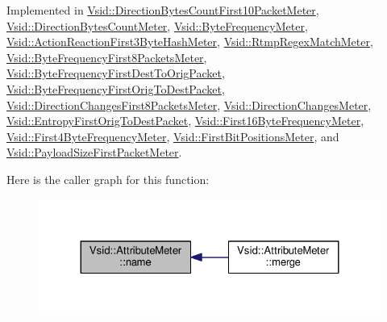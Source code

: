 Implemented in \hyperlink{class_vsid_1_1_direction_bytes_count_first10_packet_meter_a7b947a2f9a0c68e8f26d33731ddee1e4}{Vsid\-::\-Direction\-Bytes\-Count\-First10\-Packet\-Meter}, \hyperlink{class_vsid_1_1_direction_bytes_count_meter_aa6dbbee305932631395d596f8c68c7f9}{Vsid\-::\-Direction\-Bytes\-Count\-Meter}, \hyperlink{class_vsid_1_1_byte_frequency_meter_a84dda9598454a580bffa6ffb92e9c4a0}{Vsid\-::\-Byte\-Frequency\-Meter}, \hyperlink{class_vsid_1_1_action_reaction_first3_byte_hash_meter_a71143e12fa3872e47c84836bfe644b3c}{Vsid\-::\-Action\-Reaction\-First3\-Byte\-Hash\-Meter}, \hyperlink{class_vsid_1_1_rtmp_regex_match_meter_aefe5e0684e01691437ae8870ab97e339}{Vsid\-::\-Rtmp\-Regex\-Match\-Meter}, \hyperlink{class_vsid_1_1_byte_frequency_first8_packets_meter_a9ef45a8d4e453ac5b67260c186cefdce}{Vsid\-::\-Byte\-Frequency\-First8\-Packets\-Meter}, \hyperlink{class_vsid_1_1_byte_frequency_first_dest_to_orig_packet_ae284d11d94bbc50a8d573fbdc4e4f1a5}{Vsid\-::\-Byte\-Frequency\-First\-Dest\-To\-Orig\-Packet}, \hyperlink{class_vsid_1_1_byte_frequency_first_orig_to_dest_packet_afe5165442500735389c683bd8c91cbdd}{Vsid\-::\-Byte\-Frequency\-First\-Orig\-To\-Dest\-Packet}, \hyperlink{class_vsid_1_1_direction_changes_first8_packets_meter_a14276ee9ec9c10f80e10ea49e2d8aa27}{Vsid\-::\-Direction\-Changes\-First8\-Packets\-Meter}, \hyperlink{class_vsid_1_1_direction_changes_meter_a0c708fed3d322241c4d33aaa1ce4f05f}{Vsid\-::\-Direction\-Changes\-Meter}, \hyperlink{class_vsid_1_1_entropy_first_orig_to_dest_packet_af720bd81b954f179ba62866b66454358}{Vsid\-::\-Entropy\-First\-Orig\-To\-Dest\-Packet}, \hyperlink{class_vsid_1_1_first16_byte_frequency_meter_a634fd6e5333e83cf5401782a449cc068}{Vsid\-::\-First16\-Byte\-Frequency\-Meter}, \hyperlink{class_vsid_1_1_first4_byte_frequency_meter_a7e3eca220933b294beefa431801ffcc8}{Vsid\-::\-First4\-Byte\-Frequency\-Meter}, \hyperlink{class_vsid_1_1_first_bit_positions_meter_afaca2ad43403ff1bea08d64a8e584197}{Vsid\-::\-First\-Bit\-Positions\-Meter}, and \hyperlink{class_vsid_1_1_payload_size_first_packet_meter_ae0cea8c8ac9d99246ccca54330ee3897}{Vsid\-::\-Payload\-Size\-First\-Packet\-Meter}.



Here is the caller graph for this function\-:
\nopagebreak
\begin{figure}[H]
\begin{center}
\leavevmode
\includegraphics[width=324pt]{class_vsid_1_1_attribute_meter_a24d5a7141e89e948c05edf8f70be8c53_icgraph}
\end{center}
\end{figure}


